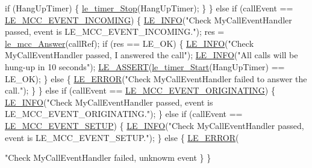\begin{DoxyCodeInclude}
{{{{        \textcolor{keywordflow}{if} (HangUpTimer)
        \{
            \hyperlink{le__timer_8h_af310daa378bd6ca39373a47e073f2243}{le\_timer\_Stop}(HangUpTimer);
        \}
    \}
    \textcolor{keywordflow}{else} \textcolor{keywordflow}{if} (callEvent == \hyperlink{le__mcc__interface_8h_aefc4679ffa76d0e04c578572c22f06cfab37936f33d31259ea0c16169ba852bd0}{LE\_MCC\_EVENT\_INCOMING})
    \{
        \hyperlink{le__log_8h_a23e6d206faa64f612045d688cdde5808}{LE\_INFO}(\textcolor{stringliteral}{"Check MyCallEventHandler passed, event is LE\_MCC\_EVENT\_INCOMING."});
        res = \hyperlink{le__mcc__interface_8h_a598349c6ccfa151dbd1d2f2a9c293ca4}{le\_mcc\_Answer}(callRef);
        \textcolor{keywordflow}{if} (res == LE\_OK)
        \{
            \hyperlink{le__log_8h_a23e6d206faa64f612045d688cdde5808}{LE\_INFO}(\textcolor{stringliteral}{"Check MyCallEventHandler passed, I answered the call"});
            \hyperlink{le__log_8h_a23e6d206faa64f612045d688cdde5808}{LE\_INFO}(\textcolor{stringliteral}{"All calls will be hung-up in 10 seconds"});
            \hyperlink{le__log_8h_ac0dbbef91dc0fed449d0092ff0557b39}{LE\_ASSERT}(\hyperlink{watchdog_8c_a8f0ef9d6af3090467f5a969c799ad25d}{le\_timer\_Start}(HangUpTimer) == LE\_OK);
        \}
        \textcolor{keywordflow}{else}
        \{
            \hyperlink{le__log_8h_a353590f91b3143a7ba3a416ae5a50c3d}{LE\_ERROR}(\textcolor{stringliteral}{"Check MyCallEventHandler failed to answer the call."});
        \}
    \}
    \textcolor{keywordflow}{else} \textcolor{keywordflow}{if} (callEvent == \hyperlink{le__mcc__interface_8h_aefc4679ffa76d0e04c578572c22f06cfa1fa56f470ae87b06edb532f9e2b593e0}{LE\_MCC\_EVENT\_ORIGINATING})
    \{
        \hyperlink{le__log_8h_a23e6d206faa64f612045d688cdde5808}{LE\_INFO}(\textcolor{stringliteral}{"Check MyCallEventHandler passed, event is LE\_MCC\_EVENT\_ORIGINATING."});
    \}
    \textcolor{keywordflow}{else} \textcolor{keywordflow}{if} (callEvent == \hyperlink{le__mcc__interface_8h_aefc4679ffa76d0e04c578572c22f06cfa57dc02ca807a7a7c616e947f3651de9f}{LE\_MCC\_EVENT\_SETUP})
    \{
        \hyperlink{le__log_8h_a23e6d206faa64f612045d688cdde5808}{LE\_INFO}(\textcolor{stringliteral}{"Check MyCallEventHandler passed, event is LE\_MCC\_EVENT\_SETUP."});
    \}
    \textcolor{keywordflow}{else}
    \{
        \hyperlink{le__log_8h_a353590f91b3143a7ba3a416ae5a50c3d}{LE\_ERROR}(\textcolor{stringliteral}{"Check MyCallEventHandler failed, unknowm event %
    \}
\}


}}}}}
\end{DoxyCodeInclude}
